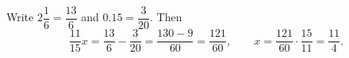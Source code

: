 Write $2\dfrac{1}{6}=\dfrac{13}{6}$ and $0.15=\dfrac{3}{20}$. Then
\[
\dfrac{11}{15}x=\dfrac{13}{6}-\dfrac{3}{20}=\dfrac{130-9}{60}=\dfrac{121}{60},\qquad x=\dfrac{121}{60}\cdot\dfrac{15}{11}=\boxed{\dfrac{11}{4}}.
\]
